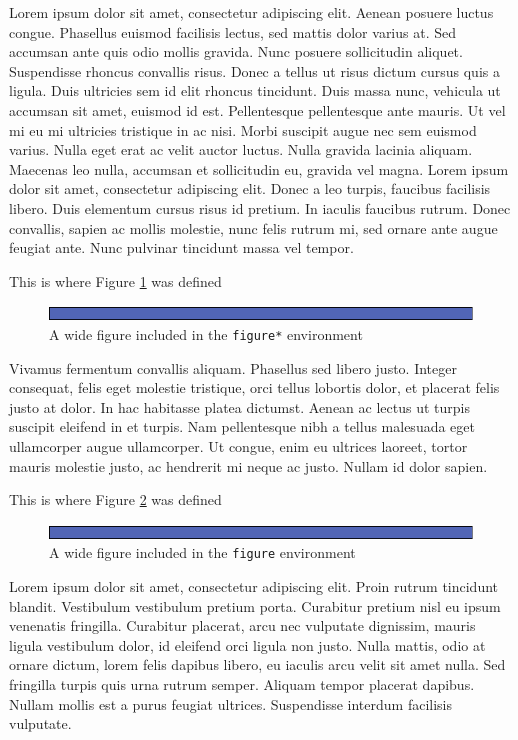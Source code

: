 \documentclass[twocolumn]{article}
\begin{document}
Lorem ipsum dolor sit amet, consectetur adipiscing elit. Aenean posuere luctus congue. Phasellus euismod facilisis lectus, sed mattis dolor varius at. Sed accumsan ante quis odio mollis gravida. Nunc posuere sollicitudin aliquet. Suspendisse rhoncus convallis risus. Donec a tellus ut risus dictum cursus quis a ligula. Duis ultricies sem id elit rhoncus tincidunt. Duis massa nunc, vehicula ut accumsan sit amet, euismod id est. Pellentesque pellentesque ante mauris. Ut vel mi eu mi ultricies tristique in ac nisi. Morbi suscipit augue nec sem euismod varius. Nulla eget erat ac velit auctor luctus. Nulla gravida lacinia aliquam. Maecenas leo nulla, accumsan et sollicitudin eu, gravida vel magna. Lorem ipsum dolor sit amet, consectetur adipiscing elit. Donec a leo turpis, faucibus facilisis libero. Duis elementum cursus risus id pretium. In iaculis faucibus rutrum. Donec convallis, sapien ac mollis molestie, nunc felis rutrum mi, sed ornare ante augue feugiat ante. Nunc pulvinar tincidunt massa vel tempor.

{\Large This is where Figure \ref{fig:fig*} was defined}
\begin{figure}[htbp]
  \includegraphics[width=1\textwidth]{box.pdf}
 \caption{A wide figure included in the \texttt{figure*} environment}
  \label{fig:fig*}
\end{figure}

Vivamus fermentum convallis aliquam. Phasellus sed libero justo. Integer consequat, felis eget molestie tristique, orci tellus lobortis dolor, et placerat felis justo at dolor. In hac habitasse platea dictumst. Aenean ac lectus ut turpis suscipit eleifend in et turpis. Nam pellentesque nibh a tellus malesuada eget ullamcorper augue ullamcorper. Ut congue, enim eu ultrices laoreet, tortor mauris molestie justo, ac hendrerit mi neque ac justo. Nullam id dolor sapien. 

{\Large This is where Figure \ref{fig:fig} was defined}
\begin{figure}[htbp]
  \includegraphics[width=\textwidth]{box.pdf}
  \caption{A wide figure included in the \texttt{figure} environment}
  \label{fig:fig}
\end{figure}

Lorem ipsum dolor sit amet, consectetur adipiscing elit. Proin rutrum tincidunt blandit. Vestibulum vestibulum pretium porta. Curabitur pretium nisl eu ipsum venenatis fringilla. Curabitur placerat, arcu nec vulputate dignissim, mauris ligula vestibulum dolor, id eleifend orci ligula non justo. Nulla mattis, odio at ornare dictum, lorem felis dapibus libero, eu iaculis arcu velit sit amet nulla. Sed fringilla turpis quis urna rutrum semper. Aliquam tempor placerat dapibus. Nullam mollis est a purus feugiat ultrices. Suspendisse interdum facilisis vulputate.
\end{document}
